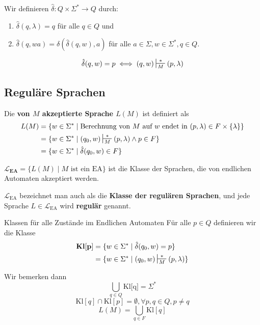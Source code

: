 \documentclass[a4paper, 11pt]{article}
\begin{document}
	\begin{mainbox}{}
		Wir definieren $\hat{\delta}: Q \times \Sigma^* \to Q$ durch:
		\begin{enumerate}[label=(\roman*)]
			\item $\hat{\delta}(q, \lambda) = q$ für alle $q \in Q$ und
			\item $\hat{\delta}(q, wa) = \delta(\hat{\delta}(q,w), a)$ für alle $a \in \Sigma, w \in \Sigma^*, q \in Q$.
		\end{enumerate}
	\end{mainbox}
	$$\hat{\delta}(q, w) = p \iff (q, w) \sststile{M}{*} (p, \lambda)$$




	\subsection{Reguläre Sprachen}

	Die \textbf{von $M$ akzeptierte Sprache $L(M)$} ist definiert als
	\begin{align*}
		L(M) &= \{w \in \Sigma^* \mid \text{Berechnung von }M \text{ auf } w \text{ endet in } (p, \lambda) \in F \times \{\lambda \}\}\\
		&= \{w \in \Sigma^* \mid (q_0, w)\sststile{M}{*}(p, \lambda) \land p \in F\}\\
		&= \{w \in \Sigma^* \mid \hat{\delta}(q_0, w) \in F\}
	\end{align*}
	\begin{mainbox}{}
		$\mathbf{\mathcal{L}_{\textbf{EA}}} = \{L(M) \mid M \text{ ist ein EA}\}$ ist die Klasse der Sprachen, die von endlichen Automaten akzeptiert werden.

		$\mathcal{L}_{\text{EA}}$ bezeichnet man auch als die \textbf{Klasse der regulären Sprachen}, und jede Sprache $L \in \mathcal{L}_{\text{EA}}$ wird \textbf{regulär} genannt.
	\end{mainbox}

	\begin{mainbox}{Klassen für alle Zustände im Endlichen Automaten}
		Für alle $p \in Q$ definieren wir die Klasse
		\begin{align*}
			\textbf{Kl}\mathbf{[p]} &= \{w \in \Sigma^* \mid \hat{\delta}(q_0, w) = p\}\\
			&= \{w \in \Sigma^* \mid (q_0, w) \sststile{M}{*}(p, \lambda)\}
		\end{align*}
	\end{mainbox}
	Wir bemerken dann
	$$\bigcup_{q \in Q}\text{Kl[q]} = \Sigma^*$$
    $$\text{Kl}[q] \cap \text{Kl}[p] = \emptyset, \forall p, q \in Q, p \neq q$$
    $$L(M) = \bigcup_{q \in F}\text{Kl}[q]$$
\end{document}
